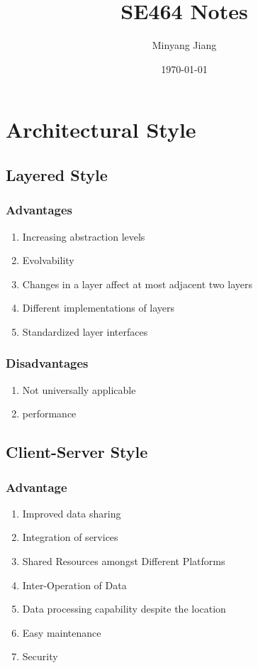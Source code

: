 \documentclass[12pt, a4paper]{article}
\title{\huge SE464 Notes}
\author{Minyang Jiang}
\date{\today}
\newcommand{\NP}{\newpage \vspace*{-0.4in}}
\begin{document}
\maketitle

\NP
\section*{Architectural Style}
\subsection{Layered Style}
\subsubsection*{Advantages}
\begin{enumerate}
\item Increasing abstraction levels
\item Evolvability
\item Changes in a layer affect at most adjacent two layers
\item Different implementations of layers
\item Standardized layer interfaces
\end{enumerate}
\subsubsection*{Disadvantages}
\begin{enumerate}
  \item Not universally applicable
  \item performance
\end{enumerate}

\subsection{Client-Server Style}
\subsubsection*{Advantage}
\begin{enumerate}
  \item Improved data sharing
  \item Integration of services
  \item Shared Resources amongst Different Platforms
  \item Inter-Operation of Data
  \item Data processing capability despite the location
  \item Easy maintenance
  \item Security
\end{enumerate}
\end{document}
